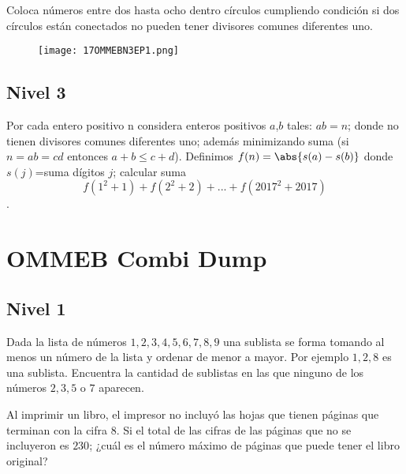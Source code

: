 \begin{problem}[OMMEB 2017]
    Coloca números entre dos hasta ocho dentro círculos 
    cumpliendo condición si dos círculos están conectados no 
    pueden tener divisores comunes diferentes uno.
\end{problem}

\begin{figure}[h]
    \centering
    \texttt{[image: 17OMMEBN3EP1.png]}
\end{figure}

\section{Nivel 3}

\begin{problem}[OMMEB 2017]
    Por cada entero positivo n considera enteros positivos 
    $a$,$b$ tales: $ab=n$; donde no tienen divisores comunes 
    diferentes uno; además minimizando suma (si $n=ab=cd$ 
    entonces $a+b\le c+d$). Definimos $f(n)=\abs{s(a)-s(b)}$ 
    donde $s(j)$=suma dígitos $j$; calcular suma 
    \[f(1^2+1)+f(2^2+2)+...+f(2017^2+2017)\].
\end{problem}

\chapter{OMMEB Combi Dump}

\section{Nivel 1}

\begin{problem}[OMMEB 2017]
    Dada la lista de números \(1, 2, 3, 4, 5, 6, 7, 8, 9\) 
    una sublista se forma tomando al menos un número de la 
    lista y ordenar de menor a mayor. Por ejemplo \(1, 2, 8\) 
    es una sublista. Encuentra la cantidad de sublistas en las 
    que ninguno de los números \(2, 3, 5\) o \(7\) aparecen.
\end{problem}

\begin{problem}[OMMEB 2017]
    Al imprimir un libro, el impresor no incluyó las hojas que 
    tienen páginas que terminan con la cifra \(8\). 
    Si el total de las cifras de las páginas que no se 
    incluyeron es \(230\); ¿cuál es el número máximo de páginas 
    que puede tener el libro original?
\end{problem}


